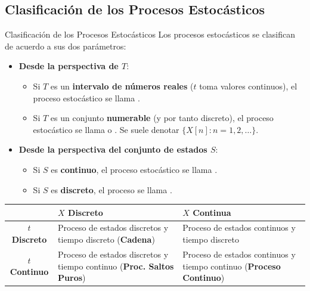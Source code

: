 \documentclass[10pt, envcountsect, handout, aspectratio=1610, hyperref={hypertexnames=true}]{beamer}
\begin{document}

\subsection{Clasificación de los Procesos Estocásticos}




\begin{frame}{Clasificación de los Procesos Estocásticos}
    Los procesos estocásticos se clasifican de acuerdo a sus dos parámetros:
    \begin{itemize}
        \item \textbf{\color{reddark} Desde la perspectiva de $T$}:
        \begin{itemize}
            \item Si $T$ es un \textbf{intervalo de números reales} ($t$ toma valores continuos), el proceso estocástico se llama .
            \item Si $T$ es un conjunto \textbf{numerable} (y por tanto discreto), el proceso estocástico se llama  o . Se suele denotar $\{X[n]: n=1, 2,\ldots\}$.
        \end{itemize}
        
        \item \textbf{\color{reddark} Desde la perspectiva del conjunto de estados $S$}:
        \begin{itemize}
            \item Si $S$ es \textbf{continuo}, el proceso estocástico se llama .
            \item Si $S$ es \textbf{discreto}, el proceso se llama .
        \end{itemize}
    \end{itemize}

\vfill


\begin{tabularx}{\textwidth}{|c|X|X|}
    \hline
                      & $X$ \textbf{Discreto}                                      & $X$ \textbf{Continua}                                                \\ \hline
    \textbf{$t$ Discreto} & Proceso de estados discretos y tiempo discreto (\textbf{Cadena}) & Proceso de estados continuos y tiempo discreto        \\ \hline
    \textbf{$t$ Continuo} & Proceso de estados discretos y tiempo continuo (\textbf{Proc. Saltos Puros})    & Proceso de estados continuos y tiempo continuo (\textbf{Proceso Continuo})   \\ \hline
\end{tabularx}


\end{frame}
\end{document}
